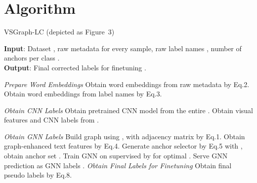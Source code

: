 \documentclass[sigconf]{acmart}
\begin{document}
\section{Algorithm}
\begin{algorithm}[]
	\caption{VSGraph-LC (depicted as Figure~3)}
	\label{alg:algorithm}
	\begin{flushleft}
		\textbf{Input}: Dataset , raw metadata  for every sample, raw label names , number of anchors per class .\\
		\textbf{Output}: Final corrected labels  for finetuning .
	\end{flushleft}
	\begin{algorithmic}[1] \STATEx \hspace{-0.6cm} \textit{ Prepare Word Embeddings}
		\STATE Obtain word embeddings  from raw metadata  by Eq.2.
		\STATE Obtain word embeddings  from label names  by Eq.3.
		
		\STATEx \hspace{-0.6cm} \textit{ Obtain CNN Labels}
		\STATE Obtain pretrained CNN model  from the entire .
		\STATE Obtain visual features  and CNN labels  from .
		
		\STATEx \hspace{-0.6cm} \textit{ Obtain GNN Labels}
		\STATE Build graph  using , with adjacency matrix  by Eq.1.
		\STATE Obtain graph-enhanced text features  by Eq.4.
		\STATE Generate anchor selector by Eq.5 with , obtain anchor set .
		\STATE Train GNN on  supervised by  for optimal .
		\STATE Serve GNN prediction  as GNN labels .
		\STATEx \hspace{-0.6cm} \textit{ Obtain Final Labels for Finetuning}
		\STATE Obtain final pseudo labels  by Eq.8.
	\end{algorithmic}
\end{algorithm}
\end{document}
